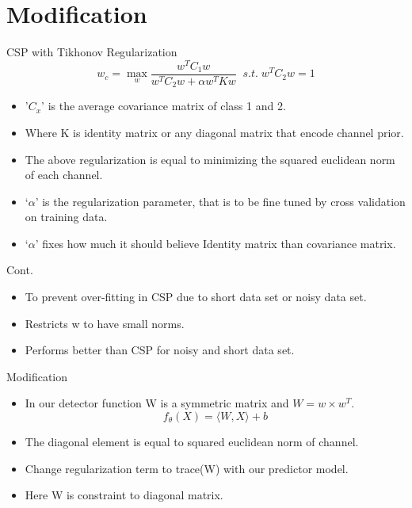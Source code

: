 \documentclass[11pt]{beamer}
\begin{document}
 \section{Modification}
\begin{frame}{CSP with Tikhonov Regularization}
 \[  w_c= \max_w \frac{w^T C_1 w}{w^T C_2 w + \alpha w^T K w}\;\; s.t.\;  w^TC_2 w=1 \]
 \begin{itemize}  [default]
   \item '$C_x$' is the average covariance matrix of class 1 and 2.   
   \item Where K is identity matrix or any diagonal matrix that encode channel prior.
   \item The above regularization is equal to minimizing the squared euclidean norm of each channel.
\item ‘$\alpha$’ is the regularization parameter, that is to be fine tuned by cross validation on training data.
\item ‘$\alpha$’ fixes how much it should believe Identity matrix than covariance matrix.

   \end{itemize}
 \end{frame}
\begin{frame}{Cont.}
  \begin{itemize}  [default]
   \item To prevent over-fitting in CSP due to short data set or noisy data set.
\item Restricts w to have small norms. 
\item Performs better than CSP for noisy and short data set.
   \end{itemize}
 \end{frame}
\begin{frame}{Modification}
 \begin{itemize} [default]
\item In our detector function W is a symmetric matrix and $W=w\times w^T$.
 \[  f_\theta\left(X\right)=\langle W,X\rangle+b  \]
\item The diagonal element is equal to squared euclidean norm of channel.
\item Change regularization term to trace(W) with our predictor model.
\item Here W is constraint to diagonal matrix.
  \end{itemize}
 \end{frame}
\end{document}
